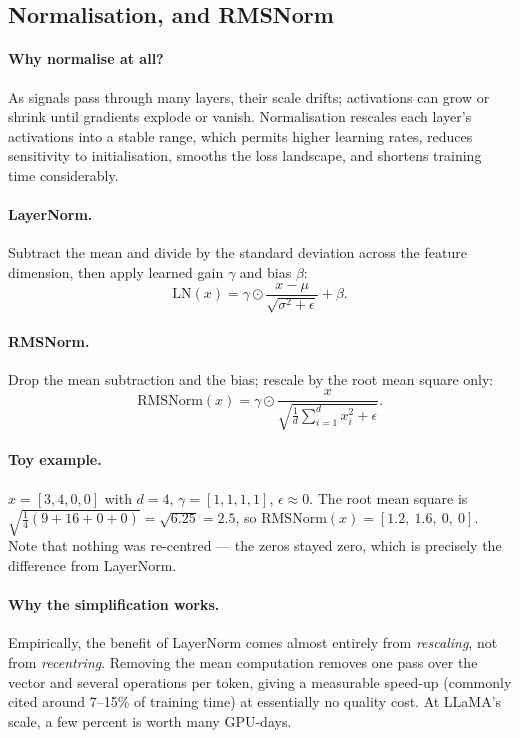 \documentclass[11pt,a4paper]{article}
\begin{document}
\subsection{Normalisation, and RMSNorm}

\paragraph{Why normalise at all?} As signals pass through many layers, their scale drifts;
activations can grow or shrink until gradients explode or vanish. Normalisation rescales
each layer's activations into a stable range, which permits higher learning rates, reduces
sensitivity to initialisation, smooths the loss landscape, and shortens training time
considerably.

\paragraph{LayerNorm.} Subtract the mean and divide by the standard deviation across the
feature dimension, then apply learned gain $\gamma$ and bias $\beta$:
\[
\mathrm{LN}(x) = \gamma \odot \frac{x - \mu}{\sqrt{\sigma^2 + \epsilon}} + \beta .
\]

\paragraph{RMSNorm.} Drop the mean subtraction and the bias; rescale by the root mean square
only:
\[
\mathrm{RMSNorm}(x) = \gamma \odot \frac{x}{\sqrt{\frac{1}{d}\sum_{i=1}^{d} x_i^2 + \epsilon}} .
\]

\paragraph{Toy example.} $x = [3, 4, 0, 0]$ with $d = 4$, $\gamma = [1,1,1,1]$,
$\epsilon \approx 0$. The root mean square is
$\sqrt{\tfrac{1}{4}(9 + 16 + 0 + 0)} = \sqrt{6.25} = 2.5$, so
$\mathrm{RMSNorm}(x) = [1.2,\ 1.6,\ 0,\ 0]$. Note that nothing was re-centred --- the zeros
stayed zero, which is precisely the difference from LayerNorm.

\paragraph{Why the simplification works.} Empirically, the benefit of LayerNorm comes almost
entirely from \emph{rescaling}, not from \emph{recentring}. Removing the mean computation
removes one pass over the vector and several operations per token, giving a measurable
speed-up (commonly cited around 7--15\% of training time) at essentially no quality cost. At
LLaMA's scale, a few percent is worth many GPU-days.
\end{document}
